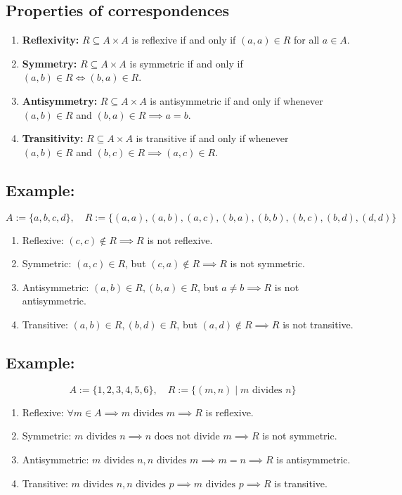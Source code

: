 \documentclass[11pt]{article}
\begin{document}
\subsection{Properties of correspondences}
\begin{enumerate}
    \item \textbf{Reflexivity:} $R \subseteq A \times A$ is reflexive if and only if $(a,a) \in R$ for all $a \in A$.
    \item \textbf{Symmetry:} $R \subseteq A \times A$ is symmetric if and only if $(a,b) \in R \Leftrightarrow (b,a) \in R$.
    \item \textbf{Antisymmetry:} $R \subseteq A \times A$ is antisymmetric if and only if whenever \\ 
    $(a,b) \in R$ and $(b,a) \in R \implies a = b$.
    \item \textbf{Transitivity:} $R \subseteq A \times A$ is transitive if and only if whenever \\
    $(a,b) \in R$ and $(b,c) \in R \implies (a,c) \in R$.
\end{enumerate}

\subsection*{Example:}
\[
A := \{a, b, c, d\}, \quad R := \{(a,a), (a,b), (a,c), (b,a), (b,b), (b,c), (b,d), (d,d)\}
\]
\begin{enumerate}
    \item Reflexive: $(c,c) \notin R \implies R$ is not reflexive.
    \item Symmetric: $(a,c) \in R$, but $(c,a) \notin R \implies R$ is not symmetric.
    \item Antisymmetric: $(a,b) \in R, (b,a) \in R$, but $a \neq b \implies R$ is not antisymmetric.
    \item Transitive: $(a,b) \in R, (b,d) \in R$, but $(a,d) \notin R \implies R$ is not transitive.
\end{enumerate}

\subsection*{Example:}
\[
A := \{1, 2, 3, 4, 5, 6\}, \quad R := \{(m,n) \mid m \text{ divides } n\}
\]
\begin{enumerate}
    \item Reflexive: $\forall m \in A \implies m \text{ divides } m \implies R$ is reflexive.
    \item Symmetric: $m \text{ divides } n \implies n \text{ does not divide } m \implies R$ is not symmetric.
    \item Antisymmetric: $m \text{ divides } n, n \text{ divides } m \implies m = n \implies R$ is antisymmetric.
    \item Transitive: $m \text{ divides } n, n \text{ divides } p \implies m \text{ divides } p \implies R$ is transitive.
\end{enumerate}
\end{document}
